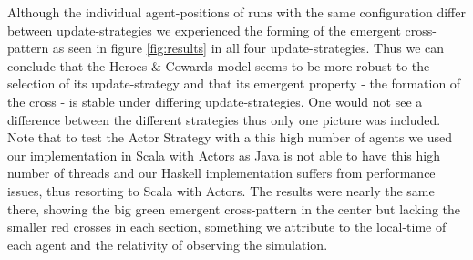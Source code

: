 Although the individual agent-positions of runs with the same configuration differ between update-strategies we experienced the forming of the emergent cross-pattern as seen in figure \ref{fig:results} in all four update-strategies. Thus we can conclude that the Heroes \& Cowards model seems to be more robust to the selection of its update-strategy and that its emergent property - the formation of the cross - is stable under differing update-strategies. One would not see a difference between the different strategies thus only one picture was included. Note that to test the Actor Strategy with a this high number of agents we used our implementation in Scala with Actors as Java is not able to have this high number of threads and our Haskell implementation suffers from performance issues, thus resorting to Scala with Actors. The results were nearly the same there, showing the big green emergent cross-pattern in the center but lacking the smaller red crosses in each section, something we attribute to the local-time of each agent and the relativity of observing the simulation.